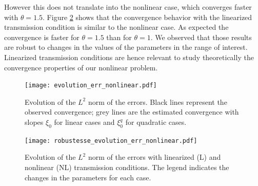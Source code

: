 However this does not translate into the nonlinear case, which converges faster with $\theta=1.5$.
Figure \ref{fig:robustesseEvolutionErrNonlinear}
shows that the convergence behavior with the linearized transmission condition is
similar to the nonlinear case.
As expected the convergence is faster for $\theta=1.5$
than for $\theta=1$.
We observed that those results are robust to changes in the values of the parameters in the range of interest.
Linearized transmission conditions are hence relevant to study
theoretically the
convergence properties of our nonlinear problem.
\begin{figure}
    \centering
    \texttt{[image: evolution\_err\_nonlinear.pdf]}
    \caption{Evolution of the  $L^2$ norm of the errors. Black lines represent the observed convergence; grey lines are the estimated convergence with slopes $\xi_0$ for linear cases and $\xi_0^q$ for quadratic cases.}
    \label{fig:evolutionErrNonlinear}
\end{figure}
\begin{figure}
    \centering
    \texttt{[image: robustesse\_evolution\_err\_nonlinear.pdf]}
    \caption{Evolution of the  $L^2$ norm of the errors with linearized (L) and nonlinear (NL) transmission conditions. The legend indicates the changes in the parameters for each case. }
    \label{fig:robustesseEvolutionErrNonlinear}
\end{figure}
%
